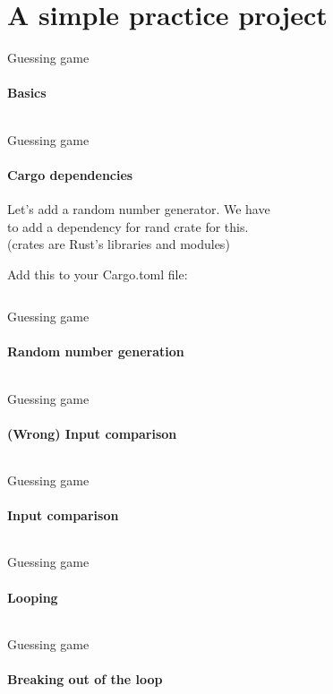\documentclass[usenames,dvipsnames,10pt,aspectratio=169]{beamer}
\begin{document}
\section{A simple practice project}

\begin{frame}{Guessing game}
	\framesubtitle{Basics}
	\inputminted[fontsize=\footnotesize]{rust}{code/guess1.rs}
	\vspace{0.4cm}
\end{frame}

\begin{frame}{Guessing game}
	\framesubtitle{Cargo dependencies}
	\Large
	Let's add a random number generator. We have\\
	to add a dependency for \textcolor{ucuyellow}{rand} crate for this.\\
	(crates are Rust's libraries and modules)
	\vspace{0.5cm}

	Add this to your Cargo.toml file:
	\vspace{0.4cm}
	\inputminted[fontsize=\Large]{toml}{code/toml1.toml}
\end{frame}

\begin{frame}{Guessing game}
	\framesubtitle{Random number generation}
	\inputminted[fontsize=\footnotesize]{rust}{code/guess2.rs}
\end{frame}

\begin{frame}{Guessing game}
	\framesubtitle{(Wrong) Input comparison}
	\inputminted[fontsize=\normalsize]{rust}{code/guess3.rs}
\end{frame}

\begin{frame}{Guessing game}
	\framesubtitle{Input comparison}
	\inputminted[fontsize=\normalsize]{rust}{code/guess4.rs}
\end{frame}


\begin{frame}{Guessing game}
	\framesubtitle{Looping}
	\inputminted[fontsize=\normalsize]{rust}{code/guess5.rs}
\end{frame}

\begin{frame}{Guessing game}
	\framesubtitle{Breaking out of the loop}
	\inputminted[fontsize=\large]{rust}{code/guess6.rs}
\end{frame}
\end{document}
